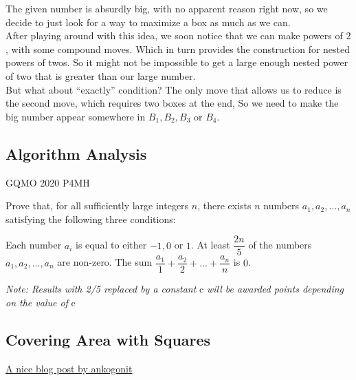 \begin{solution}
    The given number is absurdly big, with no apparent reason right now, so we
    decide to just look for a way to maximize a box as much as we can.\\

    After playing around with this idea, we soon notice that we can make
    powers of $2$, with some compound moves. Which in turn provides the
    construction for nested powers of twos. So it might not be impossible to
    get a large enough nested power of two that is greater than our large
    number.\\

    But what about ``exactly'' condition? The only move that allows us to
    reduce is the second move, which requires two boxes at the end, So we need
    to make the big number appear somewhere in $B_1, B_2, B_3$ or $B_4$.
\end{solution}



\newpage
\subsection{Algorithm Analysis}

{GQMO 2020 P4}{MH}{
    Prove that, for all sufficiently large integers $n$, there
    exists $n$ numbers $a_1, a_2, \dots, a_n$ satisfying the following three
    conditions:

    Each number $a_i$ is equal to either $-1, 0$ or $1$.  At least
    $\dfrac{2n}{5}$ of the numbers $a_1, a_2, \dots, a_n$ are non-zero.  The
    sum $\dfrac{a_1}{1} + \dfrac{a_2}{2} + \dots + \dfrac{a_n}{n}$ is $0$.

    \textit{Note: Results with 2/5 replaced by a constant } c \textit{ will be
    awarded points depending on the value of } c
}


\newpage\subsection{Covering Area with Squares}

\begin{myitemize} 
\item \href{https://artofproblemsolving.com/community/
    c301601h1551769_cover_story_squares}{A nice blog post by ankogonit} 
\end{myitemize}


